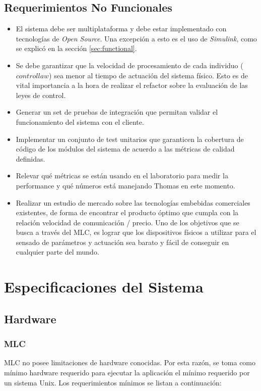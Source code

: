 \documentclass[a4paper,10pt]{article}
\begin{document}
    \subsection{Requerimientos No Funcionales} \label{sec:no_functional}
        \begin{itemize}
            \item El sistema debe ser multiplataforma y debe estar implementado con tecnologías de \textit{Open Source}. Una excepción a
            esto es el uso de \textit{Simulink}, como se explicó en la sección \ref{sec:functional}.
        \item Se debe garantizar que la velocidad de procesamiento de cada individuo ($\mathit{control law}$) sea menor al tiempo de
            actuación del sistema físico. Esto es de vital importancia a la hora de realizar el refactor sobre la evaluación de las leyes
            de control.
            \item Generar un set de pruebas de integración que permitan validar el funcionamiento del sistema con el cliente.
            \item Implementar un conjunto de test unitarios que garanticen la cobertura de código de los módulos del sistema de acuerdo
            a las métricas de calidad definidas.
            \item Relevar qué métricas se están usando en el laboratorio para medir la performance y qué números está manejando Thomas en
            este momento.
            \item Realizar un estudio de mercado sobre las tecnologías embebidas comerciales existentes, de forma de encontrar el producto
            óptimo que cumpla con la relación velocidad de comunicación / precio. Uno de los objetivos que se busca a través del MLC, es
            lograr que los dispositivos físicos a utilizar para el sensado de parámetros y actuación sea barato y fácil de conseguir
            en cualquier parte del mundo.
        \end{itemize}

    \newpage
    \section{Especificaciones del Sistema}
    \subsection{Hardware}
    \subsubsection{MLC}
        MLC no posee limitaciones de hardware conocidas. Por esta razón, se toma como mínimo hardware requerido para ejecutar la
        aplicación el mínimo requerido por un sistema Unix. Los requerimientos mínimos se listan a continuación:
\end{document}
